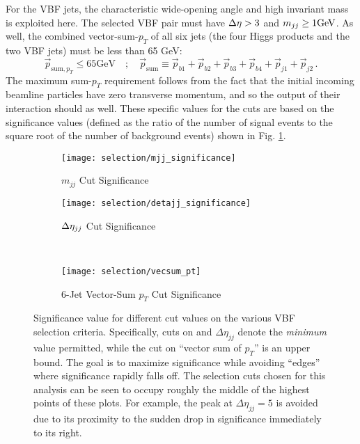         For the VBF jets, the characteristic wide-opening angle and high invariant mass is exploited here.
        The selected VBF pair must have $\Delta \eta > 3$ and $m_{jj} \geq 1 \textrm{GeV}$.
        As well, the combined vector-sum-$p_T$ of all six jets
            (the four Higgs products and the two VBF jets)
            must be less than 65 GeV:
        \begin{equation}
            \vec{p}_{\textrm{sum}, p_T} \leq 65 \textrm{GeV} \quad;\quad
            \vec{p}_{\textrm{sum}} \equiv
            \vec{p}_{b1} + \vec{p}_{b2} + 
            \vec{p}_{b3} + \vec{p}_{b4} +
            \vec{p}_{j1} + \vec{p}_{j2} 
            \,.
        \end{equation}
        The maximum sum-$p_T$ requirement follows from the fact that the initial incoming beamline particles have
            zero transverse momentum, and so the output of their interaction should as well.
        These specific values for the cuts are based on the significance values
            (defined as the ratio of the number of signal events to the square root of the number of background events)
            shown in Fig. \ref{fig:vbf_cuts}.

        \begin{figure}[tbh]
            \begin{subfigure}{0.48\textwidth}
                \texttt{[image: selection/mjj\_significance]}
                \caption{$m_{jj}$ Cut Significance}
            \end{subfigure}
            \begin{subfigure}{0.48\textwidth}
                \texttt{[image: selection/detajj\_significance]}
                \caption{$\Delta \eta_{jj}$ Cut Significance}
            \end{subfigure}\\
            \begin{subfigure}{0.48\textwidth}
                \texttt{[image: selection/vecsum\_pt]}
                \caption{6-Jet Vector-Sum $p_{T}$ Cut Significance}
            \end{subfigure}
            \caption{
                Significance value for different cut values on the various VBF selection criteria\cite{vbf_hh_4b_2018_int}.
                Specifically, cuts on \mjj and $\Delta \eta_{jj}$ denote the \textit{minimum} value permitted,
                    while the cut on ``vector sum of $p_T$'' is an upper bound.
                The goal is to maximize significance while avoiding ``edges'' where significance rapidly falls off.
                The selection cuts chosen for this analysis can be seen to occupy roughly the middle
                    of the highest points of these plots.
                For example, the peak at $\Delta \eta_{jj} = 5$ is avoided due to its proximity
                    to the sudden drop in significance immediately to its right.
            }
            \label{fig:vbf_cuts}
        \end{figure}


